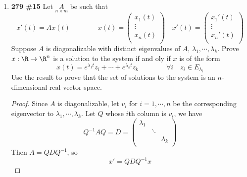 \documentclass[11pt]{article}
\begin{document}
\newcommand{\vecspace}{\mathcal{V}}
\newcommand{\field}{\mathcal{F}}
\newcommand{\trace}[1]{tr(#1)}
\renewcommand{\span}[1]{span(#1)}
\renewcommand{\dim}[1]{dim(#1)}
\newcommand{\nullity}[1]{nullity(#1)}
\newcommand{\rank}[1]{rank(#1)}
\newcommand{\cvec}[2]{\left[ #1 \right]_{#2}}
\renewcommand{\matr}[3]{\left[ #1 \right]_{#2}^{#3}}
\newcommand{\ltspace}[1]{\mathcal{L}(#1)}
\renewcommand{\det}[1]{det(#1)}





\begin{enumerate}
    \item \textbf{279 \#15} Let $\underset{n\times m}{A}$ be such that 
    \[
        x'(t) = Ax(t)
        \quad \quad \quad \quad 
        x(t) =  
        \begin{pmatrix}
            x_1(t) \\
            \vdots \\
            x_n(t) \\
        \end{pmatrix}
        \quad 
        x'(t) =  
        \begin{pmatrix}
            x_1'(t) \\
            \vdots \\
            x_n'(t) \\
        \end{pmatrix}
    \]
    Suppose $A$ is diagonalizable with distinct eigenvalues of $A$, $\lambda_1,\cdots, \lambda_k$. Prove $x:\R\to \R^n$ is a solution to the system if and oly if $x$ is of the form 
    \[
        x(t) = e^{\lambda_1 t}z_i + \cdots + e^{\lambda_k t} z_k
        \quad \quad \quad \quad 
        \forall i \quad z_i \in E_{\lambda_i}    
    \]
    Use the result to prove that the set of solutions to the system is an $n$-dimensional real vector space.
    \begin{proof}
        Since $A$ is diagonalizable, let $v_i$ for $i=1,\cdots,n$ be the corresponding eigenvector to $\lambda_1,\cdots,\lambda_k$. Let $Q$ whose $i$th column is $v_i$, we have 
        \[
            Q^{-1}AQ = D = 
            \begin{pmatrix}
                \lambda_1 & & \\
                & \ddots & \\
                & & \lambda_k \\
            \end{pmatrix}    
        \]
        Then $A = QDQ^{-1}$, so  
        \[
            x' = QDQ^{-1}x 
\]
\end{proof}
\end{enumerate}
\end{document}
